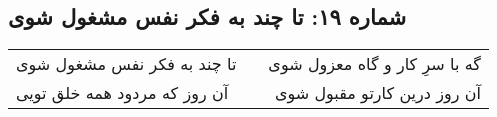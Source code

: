 \begin{center}
\section*{شماره ۱۹: تا چند به فکر نفس مشغول شوی}
\label{sec:019}
\begin{longtable}{l p{0.5cm} r}
تا چند به فکر نفس مشغول شوی
&&
گه با سرِ کار و گاه معزول شوی
\\
آن روز که مردود همه خلق تویی
&&
آن روز درین کارتو مقبول شوی
\\
\end{longtable}
\end{center}
